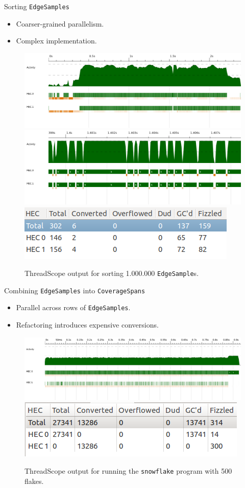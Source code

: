 \documentclass[slidestop,compress,mathserif, xcolor=table]{beamer}
\begin{document}
\begin{frame}[c]{Sorting \texttt{EdgeSamples}}
  \begin{itemize}
  \item Coarser-grained parallelism.
  \item Complex implementation.
  \end{itemize}
 \begin{figure}[h!]
  \centering
  \includegraphics[width=0.7\linewidth,trim={0cm 2cm 0 0},clip]{../threadscope/sorting/sorting-final}\\
  \includegraphics[width=0.3\linewidth,trim={4cm 3cm 5cm 0},clip]{../threadscope/sorting/sorting-final-zoom}
  \includegraphics[width=0.4\linewidth,trim={0 0 0 1cm}]{../threadscope/sorting/sorting-final-sparks}
  \caption{ThreadScope output for sorting 1.000.000 \texttt{EdgeSample}s.}
  \label{fig:sorting-thread}
\end{figure}

\end{frame}

\begin{frame}[c]{Combining \texttt{EdgeSamples} into \texttt{CoverageSpans}}
  \begin{itemize}
  \item Parallel across rows of \texttt{EdgeSamples}.
  \item Refactoring introduces expensive conversions.
  \end{itemize}
 \begin{figure}[h!]
  \centering
  \includegraphics[width=0.7\linewidth,trim={0cm 2cm 0 0},clip]{../threadscope/combinegrouped/bigflake}\\
  \includegraphics[width=0.55\linewidth,trim={0 0 0 0},clip]{../threadscope/combinegrouped/sparks}
  \caption{ThreadScope output for running the \texttt{snowflake} program with 500 flakes.}
\end{figure}
\end{frame}
\end{document}
